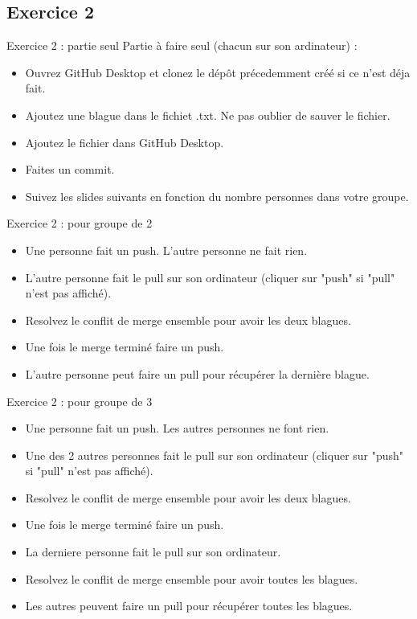 \documentclass{beamer}
\begin{document}
\subsection{Exercice 2}
\begin{frame}{Exercice 2 : partie seul}
    Partie à faire seul (chacun sur son ardinateur) :
    \begin{itemize}
        \item Ouvrez GitHub Desktop et clonez le dépôt précedemment créé
            si ce n'est déja fait.
        \item Ajoutez une blague dans le fichiet .txt. Ne pas oublier de sauver
            le fichier.
        \item Ajoutez le fichier dans GitHub Desktop.
        \item Faites un commit.
        \item Suivez les slides suivants en fonction du nombre personnes dans
            votre groupe.
    \end{itemize}
\end{frame}

\begin{frame}{Exercice 2 : pour groupe de 2}
    \begin{itemize}
        \item Une personne fait un push. L'autre personne ne fait rien.
        \item L'autre personne fait le pull sur son ordinateur
            (cliquer sur "push" si "pull" n'est pas affiché).
        \item Resolvez le conflit de merge ensemble pour avoir les deux blagues.
        \item Une fois le merge terminé faire un push.
        \item L'autre personne peut faire un pull pour récupérer la dernière blague.
    \end{itemize}
\end{frame}

\begin{frame}{Exercice 2 : pour groupe de 3}
    \begin{itemize}
        \item Une personne fait un push. Les autres personnes ne font rien.
        \item Une des 2 autres personnes fait le pull sur son ordinateur
            (cliquer sur "push" si "pull" n'est pas affiché).
        \item Resolvez le conflit de merge ensemble pour avoir les deux blagues.
        \item Une fois le merge terminé faire un push.
        \item La derniere personne fait le pull sur son ordinateur.
        \item Resolvez le conflit de merge ensemble pour avoir toutes les blagues.
        \item Les autres peuvent faire un pull pour récupérer toutes les blagues.
    \end{itemize}
\end{frame}
\end{document}
